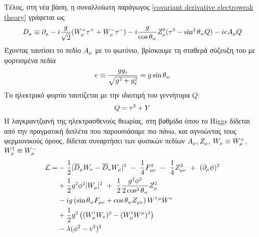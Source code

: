 Τέλος, στη νέα βάση, η συναλλοίωτη παράγωγος \eqref{covariant derivative electroweak theory} γράφεται ως
\begin{equation}\label{covariant derivative with eigenstates}
    D\subscr{\mu}\equiv \partial\subscr{\mu}-i\frac{g}{\sqrt{2}}(W\superscr{+}\subscr{\mu}\tau\superscr{+}+W\superscr{-}\subscr{\mu}\tau\superscr{-})-i\frac{g}{\cos\theta\subscr{w}}Z\superscr{0}\subscr{\mu}(\tau\superscr{3}-\sin\superscr{2}\theta\subscr{w}Q)-ieA\subscr{\mu}Q
\end{equation}
Έχοντας ταυτίσει το πεδίο $A\subscr{\mu}$ με το φωτόνιο, βρίσκουμε τη σταθερά σύζευξη του με φορτισμένα πεδία
\begin{equation}
    e \equiv \frac{gg\subscr{\y}}{\sqrt{g\superscr{2}+g\subscr{\y}\superscr{2}}}=g\sin\theta\subscr{w}
\end{equation}
Το ηλεκτρικό φορτίο ταυτίζεται με την ιδιοτιμή του γεννήτορα $Q$: 
\begin{equation}
    Q=\tau\superscr{3}+Y
\end{equation}
Η λαγκραντζιανή της ηλεκτρασθενούς θεωρίας, στη βαθμίδα όπου το Higgs δίδεται από την πραγματική διπλέτα που παρουσιάσαμε πιο πάνω, και αγνοώντας τους φερμιονικούς όρους, δίδεται συναρτήσει των φυσικών πεδίων $A\subscr{\mu},Z\subscr{\mu}$, $W\subscr{\mu}\equiv W\subscr{\mu}\superscr{+}$, $W^{\dagger}\subscr{\mu}\equiv W\subscr{\mu}\superscr{-}$
\begin{equation}\label{electroweak lagragian in terms of physical fields}
\begin{split}
    \mathcal{L}=& -\frac{1}{2}|\overline{D}\subscr{\mu}W\subscr{\nu}-\overline{D}\subscr{\nu}W\subscr{\mu}|\superscr{2}\,\,-\,\,\frac{1}{4}F\subscr{\mu\nu}\superscr{2}\,\,-\,\,\frac{1}{4}Z\subscr{\mu\nu}\superscr{2}\,\,+\,\,(\partial\subscr{\mu}\phi)\superscr{2}\\
    & +\frac{1}{2}g\superscr{2}\phi\superscr{2}|W\subscr{\mu}|\superscr{2}\,\,+\,\,\frac{1}{2}\frac{g\superscr{2}\phi\superscr{2}}{2\cos\superscr{2}\theta\subscr{w}}Z\subscr{\mu}\superscr{2}\\
    & -ig\left(\sin\theta\subscr{w}F\subscr{\mu\nu}+\cos\theta\subscr{w}Z\subscr{\mu\nu}\right)W\superscr{\dagger\,\mu}W\superscr{\nu}\\
    & +\frac{1}{2}g\superscr{2}\left( (W\subscr{\mu}\superscr{\dagger}W\subscr{\nu})\superscr{2}-(W\superscr{\dagger}\subscr{\mu}W\superscr{\mu})\superscr{2} \right)\\
    &-\lambda(\phi\superscr{2}-v\superscr{2})\superscr{2}
\end{split}
\end{equation}
